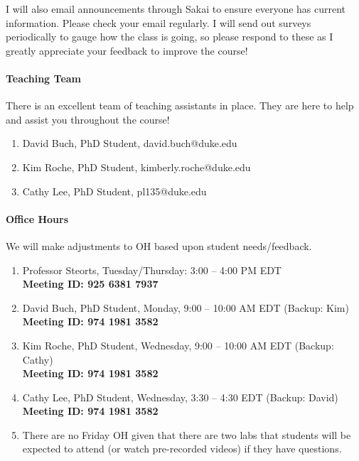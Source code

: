 \documentclass[11pt]{article}
\begin{document}
I will also email announcements through Sakai to ensure everyone has current information. Please check your email regularly. I will send out surveys periodically to gauge how the class is going, so please respond to these as I greatly appreciate your feedback to improve the course! 

\paragraph{Teaching Team}
There is an excellent team of teaching assistants in place. They are here to help and assist you throughout the course! 

\begin{enumerate}
\item David Buch, PhD Student, david.buch@duke.edu
\item Kim Roche, PhD Student, kimberly.roche@duke.edu
\item Cathy Lee, PhD Student, pl135@duke.edu
\end{enumerate}


\paragraph{Office Hours}
We will make adjustments to OH based upon student needs/feedback. 
\begin{enumerate}
\item Professor Steorts, Tuesday/Thursday: 3:00 -- 4:00 PM EDT \\
\textbf{Meeting ID: 925 6381 7937}
\item David Buch, PhD Student, Monday, 9:00 -- 10:00 AM EDT  (Backup: Kim)\\
\textbf{Meeting ID: 974 1981 3582}
\item Kim Roche, PhD Student, Wednesday, 9:00 -- 10:00 AM EDT  (Backup: Cathy)\\
\textbf{Meeting ID: 974 1981 3582}
\item Cathy Lee, PhD Student, Wednesday, 3:30 -- 4:30 EDT (Backup: David)\\
\textbf{Meeting ID: 974 1981 3582}
\item There are no Friday OH given that there are two labs that students will be expected to attend (or watch pre-recorded videos) if they have questions. 
\end{enumerate}
\end{document}
